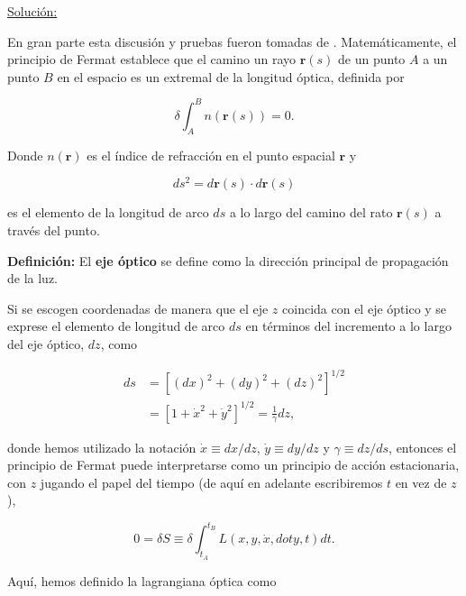 \documentclass[a4paper,10pt]{article}
\numberwithin{equation}{section}
\newcommand{\definicion}{\textbf{Definición: }}
\begin{document}
\underline{Solución:} \vspace{.3cm}

En gran parte esta discusión y pruebas fueron tomadas de \cite{holm}. Matemáticamente, el principio de Fermat establece que el camino un rayo $\mathbf{r}(s)$ 
de un punto $A$ a un punto $B$ en el espacio es un extremal de la longitud óptica, 
definida por 

\begin{equation}
 \delta \int_A^B n(\mathbf{r}(s)) = 0.
\end{equation}

Donde $n(\mathbf{r})$ es el índice de refracción en el punto espacial $\mathbf{r}$ 
y 

\begin{equation}
 ds^2 = d\mathbf{r}(s) \cdot d\mathbf{r}(s)
\end{equation}

es el elemento de la longitud de arco $ds$ a lo largo del camino del rato $\mathbf{r}(s)$ 
a través del punto.

\vspace{.3cm}

\definicion El \textbf{eje óptico} se define como la dirección principal de propagación de la 
luz. 

\vspace{.3cm}

Si se escogen coordenadas de manera que el eje $z$ coincida con el eje óptico y 
se exprese el elemento de longitud de arco $ds$ en términos del incremento a lo 
largo del eje óptico, $dz$, como 

\begin{align*}
 ds &= \left[(dx)^2 + (dy)^2 + (dz)^2 \right]^{1/2}\\
    &= \left[1 + \dot{x}^2 + \dot{y}^2 \right]^{1/2} = \frac{1}{\gamma}dz,
\end{align*}

donde hemos utilizado la notación $\dot{x} \equiv dx/dz$, $\dot{y} \equiv dy/dz$ y 
$\gamma \equiv dz/ds$, entonces el principio de Fermat puede interpretarse como 
un principio de acción estacionaria, con $z$ jugando el papel del tiempo (de aquí 
en adelante escribiremos $t$ en vez de $z$),

\begin{equation}
 0 = \delta S \equiv \delta \int_{t_A}^{t_B} L(x,y,\dot{x},dot{y},t)dt.
 \label{eq:112}
\end{equation}

Aquí, hemos definido la lagrangiana óptica como 
\end{document}
